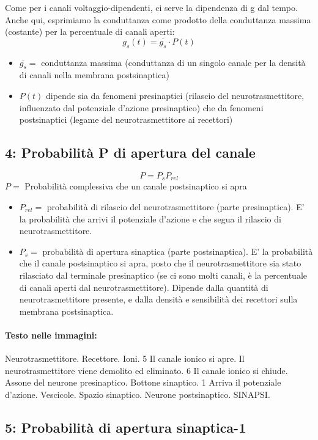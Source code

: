 Come per i canali voltaggio-dipendenti, ci serve la dipendenza di g dal tempo.\\
Anche qui, esprimiamo la conduttanza come prodotto della conduttanza massima (costante) per la percentuale di canali aperti:
\[ g_{s}(t) = \overline{g_{s}} \cdot P(t) \]
\begin{itemize}
    \item $\overline{g_{s}} =$ conduttanza massima (conduttanza di un singolo canale per la densità di canali nella membrana postsinaptica)
    \item $P(t)$ dipende sia da fenomeni presinaptici (rilascio del neurotrasmettitore, influenzato dal potenziale d'azione presinaptico) che da fenomeni postsinaptici (legame del neurotrasmettitore ai recettori)
\end{itemize}


\subsection*{ 4: Probabilità P di apertura del canale}

\[ P = P_{s} P_{rel} \]
$P =$ Probabilità complessiva che un canale postsinaptico si apra
\begin{itemize}
    \item $P_{rel} =$ probabilità di rilascio del neurotrasmettitore (parte presinaptica). E' la probabilità che arrivi il potenziale d'azione e che segua il rilascio di neurotrasmettitore.
    \item $P_{s} =$ probabilità di apertura sinaptica (parte postsinaptica). E' la probabilità che il canale postsinaptico si apra, posto che il neurotrasmettitore sia stato rilasciato dal terminale presinaptico (se ci sono molti canali, è la percentuale di canali aperti dal neurotrasmettitore). Dipende dalla quantità di neurotrasmettitore presente, e dalla densità e sensibilità dei recettori sulla membrana postsinaptica.
\end{itemize}

\paragraph*{Testo nelle immagini:}
Neurotrasmettitore. Recettore. Ioni. 5 Il canale ionico si apre. Il neurotrasmettitore viene demolito ed eliminato. 6 Il canale ionico si chiude. Assone del neurone presinaptico. Bottone sinaptico. 1 Arriva il potenziale d'azione. Vescicole. Spazio sinaptico. Neurone postsinaptico. SINAPSI.


\subsection*{ 5: Probabilità di apertura sinaptica-1}


